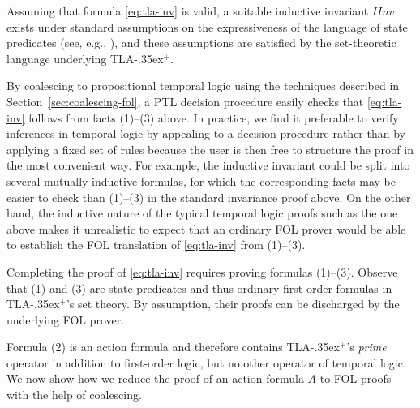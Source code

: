 \documentclass{easychair}
\newcommand{\tlaplus}{\mbox{TLA\kern -.35ex$^+$}\xspace}
\begin{document}
Assuming that formula \eqref{eq:tla-inv} is valid, a suitable inductive
invariant $IInv$ exists under standard assumptions on the expressiveness of the
language of state predicates (see, e.g., \cite{Apt:1981}), and these assumptions
are satisfied by the set-theoretic language underlying \tlaplus.

By coalescing to propositional temporal logic using the techniques described in
Section~\ref{sec:coalescing-fol}, a PTL decision procedure easily checks that
\eqref{eq:tla-inv} follows from facts (1)--(3) above. In practice, we find
it preferable to verify inferences in temporal logic by appealing to a decision
procedure rather than by applying a fixed set of rules because the
user is then free
to structure the proof in the most convenient way. For example, the inductive
invariant could be split into several mutually inductive formulas, for which the
corresponding facts may be easier to check than (1)--(3) in the
standard invariance proof above. On the other hand, the inductive nature of the
typical temporal logic proofs such as the one above makes it unrealistic to
expect that an ordinary FOL prover would be able to establish the FOL
translation of \eqref{eq:tla-inv} from (1)--(3).

Completing the proof of \eqref{eq:tla-inv} requires proving 
formulas (1)--(3). Observe that (1) and (3) are state predicates
and thus ordinary first-order formulas in \tlaplus's set theory. By assumption,
their proofs can be discharged by the underlying FOL prover.

Formula (2) is an action formula and therefore contains \tlaplus's \emph{prime}
operator in addition to first-order logic, but no other operator of temporal
logic. We now show how we reduce the proof of an action formula $A$ to FOL
proofs with the help of coalescing.
\end{document}
